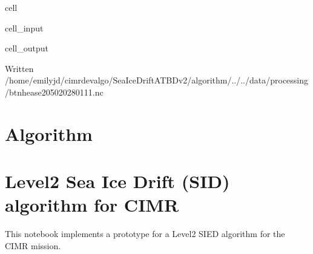 \documentclass[letterpaper,10pt,english]{jupyterBook}
\begin{document}
\begin{sphinxuseclass}{cell}
\begin{sphinxVerbatimInput}
\begin{sphinxuseclass}{cell_input}
\begin{sphinxVerbatim}[commandchars=\\\{\}]
    
  
\end{sphinxVerbatim}

\end{sphinxuseclass}\end{sphinxVerbatimInput}
\begin{sphinxVerbatimOutput}

\begin{sphinxuseclass}{cell_output}
\begin{sphinxVerbatim}[commandchars=\\\{\}]
Written /home/emilyjd/cimr\PYGZhy{}devalgo/SeaIceDrift\PYGZus{}ATBD\PYGZus{}v2/algorithm/../../data/processing/bt\PYGZus{}nh\PYGZhy{}ease2\PYGZhy{}050\PYGZus{}20280111.nc
\end{sphinxVerbatim}

\end{sphinxuseclass}\end{sphinxVerbatimOutput}

\end{sphinxuseclass}
\sphinxstepscope


\chapter{Algorithm}
\label{\detokenize{CIMR_L2_Sea_Ice_Drift_algorithm:algorithm}}\label{\detokenize{CIMR_L2_Sea_Ice_Drift_algorithm::doc}}

\chapter{Level\sphinxhyphen{}2 Sea Ice Drift (SID) algorithm for CIMR}
\label{\detokenize{CIMR_L2_Sea_Ice_Drift_algorithm:level-2-sea-ice-drift-sid-algorithm-for-cimr}}
\sphinxAtStartPar
This notebook implements a prototype for a Level\sphinxhyphen{}2 SIED algorithm for the CIMR mission.
\end{document}
